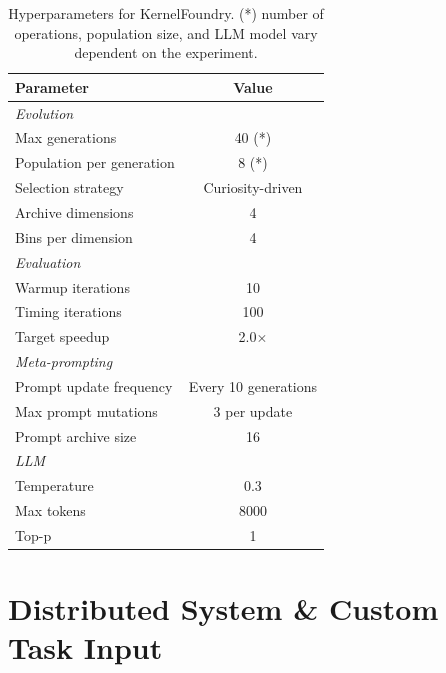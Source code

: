 \begin{table}[ht]
\centering
\begin{tabular}{lc}
\toprule
\textbf{Parameter} & \textbf{Value} \\
\midrule
\multicolumn{2}{l}{\textit{Evolution}} \\
Max generations & 40 (*) \\
Population per generation & 8 (*) \\
Selection strategy & Curiosity-driven \\
Archive dimensions & 4 \\
Bins per dimension & 4 \\
\midrule
\multicolumn{2}{l}{\textit{Evaluation}} \\
Warmup iterations & 10 \\
Timing iterations & 100 \\
Target speedup & 2.0$\times$ \\
\midrule
\multicolumn{2}{l}{\textit{Meta-prompting}} \\
Prompt update frequency & Every 10 generations \\
Max prompt mutations & 3 per update \\
Prompt archive size & 16 \\
\midrule
\multicolumn{2}{l}{\textit{LLM}} \\
Temperature & 0.3 \\
Max tokens & 8000 \\
Top-p & 1 \\
\bottomrule
\end{tabular}
\caption{Hyperparameters for KernelFoundry. (*) number of operations, population size, and LLM model vary dependent on the experiment.}
\label{tab:hyperparameters}
\end{table}


\section{Distributed System \& Custom Task Input}\label{app:custom_task_infrastructure}

